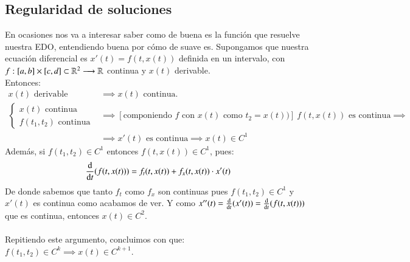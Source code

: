 \subsection{Regularidad de soluciones}
En ocasiones nos va a interesar saber como de buena es la función que resuelve nuestra EDO, entendiendo buena por cómo de suave es. Supongamos que nuestra ecuación diferencial es $x'(t) = f(t, x(t))$ definida en un intervalo, con $f:[a,b] \times [c,d] \subset \mathbb{R}^2 \longrightarrow \mathbb{R}$ continua y $x(t)$ derivable.\\
Entonces:
\begin{align*}
    x(t) \text{ derivable} &\implies x(t) \text{ continua}.\\
    \begin{cases}
        x(t) \text{ continua}\\
        f(t_1, t_2) \text{ continua}
    \end{cases} &\implies [\text{componiendo $f$ con $x(t)$ como $t_2=x(t)$})]\ f(t, x(t))\text{ es continua}\implies\\
     &\implies x'(t)\text{ es continua}\implies x(t) \in C^1
\end{align*}
Además, si $f(t_1, t_2) \in C^1$ entonces $f(t, x(t)) \in C^1$, pues:
$$
    \frac{\mathrm{d}}{\mathrm{d}t}(f(t, x(t))) = f_t(t, x(t)) + f_x(t, x(t)) \cdot x'(t)
$$
De donde sabemos que tanto $f_t$ como $f_x$ son continuas pues $f(t_1, t_2) \in C^1$ y $x'(t)$ es continua como acabamos de ver. Y como $x''(t) = \frac{\mathrm{d}}{\mathrm{d}t}(x'(t)) = \frac{\mathrm{d}}{\mathrm{d}t}(f(t, x(t)))$ que es continua, entonces $x(t) \in C^2$.\\\\
Repitiendo este argumento, concluimos con que: $f(t_1,t_2) \in C^k \implies x(t) \in C^{k+1}$.

